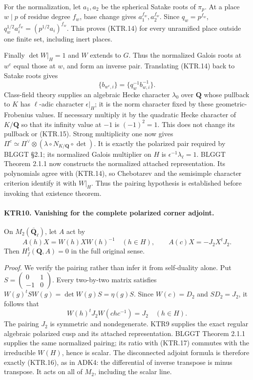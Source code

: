 For the normalization, let \(a_1,a_2\) be the spherical Satake
roots of \(\pi_p\).  At a place \(w\mid p\) of residue
degree \(f_w\), base change gives \(a_1^{f_w},a_2^{f_w}\).
Since \(q_w=p^{f_w}\),
\(q_w^{1/2}a_i^{f_w}=(p^{1/2}a_i)^{f_w}\).
This proves (KTR.14) for every unramified place outside one
finite set, including inert places.

Finally \(\det W|_H=1\) and \(W\) extends to \(G\).
Thus the normalized Galois roots at \(w^c\) equal those at
\(w\), and form an inverse pair.  Translating (KTR.14) back
to Satake roots gives
\[
 \{b_{w^c,i}\}=\{q_w^{-1}b_{w,i}^{-1}\}.
 \tag{KTR.15}
\]
Class-field theory supplies an algebraic Hecke character
\(\lambda_0\) over \(\mathbf Q\) whose pullback to \(K\)
has \(\ell\)-adic character \(\epsilon|_H\); it is the
norm character fixed by these geometric-Frobenius values.
If necessary multiply it by the quadratic Hecke character of
\(K/\mathbf Q\) so that its infinity value at \(-1\) is
\((-1)^2=1\).  This does not change its pullback or (KTR.15).
Strong multiplicity one now gives
\(\Pi^c\simeq\Pi^\vee\otimes(\lambda\circ N_{K/\mathbf Q}\circ\det)\).
It is exactly the polarized pair required by BLGGT \S2.1;
its normalized Galois multiplier on \(H\) is
\(\epsilon^{-1}\lambda_\ell=1\).
BLGGT Theorem 2.1.1 now constructs the normalized attached
representation.  Its polynomials agree with (KTR.14), so
Chebotarev and the semisimple character criterion identify it
with \(W|_H\).  Thus the pairing hypothesis is established
before invoking that existence theorem.

\paragraph{KTR10. Vanishing for the complete polarized corner adjoint.}
\label{claim:KTR10}
On \(M_2(\overline{\mathbf Q}_\ell)\), let \(A\) act by
\[
 A(h)X=W(h)XW(h)^{-1}\quad(h\in H),
 \qquad A(c)X=-J_2X^tJ_2.
 \tag{KTR.16}
\]
Then \(H^1_f(\mathbf Q,A)=0\) in the full original sense.

\emph{Proof.}
We verify the pairing rather than infer it from self-duality
alone.  Put
\(S=\left(\begin{smallmatrix}0&1\\-1&0\end{smallmatrix}\right)\).
Every two-by-two matrix satisfies
\(W(g)^t S W(g)=\det W(g)S=\eta(g)S\).
Since \(W(c)=D_2\) and \(S D_2=J_2\), it follows that
\[
             W(h)^tJ_2W(chc^{-1})=J_2\quad(h\in H).
 \tag{KTR.17}
\]
The pairing \(J_2\) is symmetric and nondegenerate.
KTR9 supplies the exact regular algebraic polarized cusp and
its attached representation.  BLGGT Theorem 2.1.1 supplies the
same normalized pairing; its ratio with (KTR.17) commutes with
the irreducible \(W(H)\), hence is scalar.  The disconnected
adjoint formula is therefore exactly (KTR.16), as in ADK4:
the differential of inverse transpose is minus transpose.
It acts on all of \(M_2\), including the scalar line.

